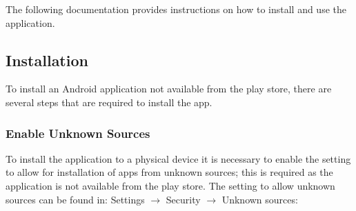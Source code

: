 The following documentation provides instructions on how to install and
use the application.

\subsection{Installation}\label{installation}

To install an Android application not available from the play store,
there are several steps that are required to install the app.

\subsubsection{Enable Unknown Sources}\label{enable-unknown-sources}

To install the application to a physical device it is necessary to
enable the setting to allow for installation of apps from unknown
sources; this is required as the application is not available from the
play store. The setting to allow unknown sources can be found in:
Settings \(\rightarrow\) Security \(\rightarrow\) Unknown sources:

